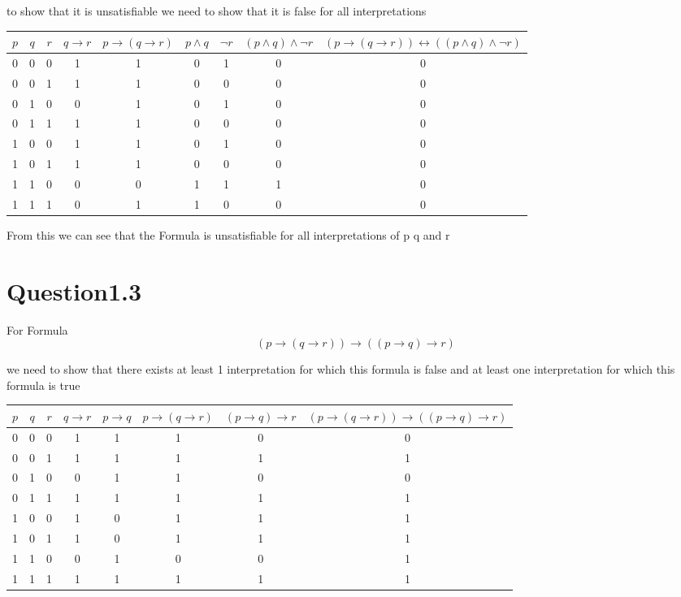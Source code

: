 \documentclass[10pt,a4paper]{article}
\begin{document}
to show that it is unsatisfiable we need to show that it is false for all interpretations

\begin{tabular}{|c|c|c|c|c|c|c|c|c|}
\hline
$p$ & $q$ & $r$ & $q \rightarrow r$ & $p \rightarrow ( q \rightarrow r )$ & $p \wedge q$ & $\neg r$ & $( p \wedge q) \wedge \neg r $ & $(p \rightarrow ( q \rightarrow r )) \leftrightarrow (( p \wedge q) \wedge \neg r) $\\
\hline
 0 & 0 & 0 & 1 & 1 & 0 & 1 & 0 & 0\\
 0 & 0 & 1 & 1 & 1 & 0 & 0 & 0 & 0\\
 0 & 1 & 0 & 0 & 1 & 0 & 1 & 0 & 0\\
 0 & 1 & 1 & 1 & 1 & 0 & 0 & 0 & 0\\
 1 & 0 & 0 & 1 & 1 & 0 & 1 & 0 & 0\\
 1 & 0 & 1 & 1 & 1 & 0 & 0 & 0 & 0\\
 1 & 1 & 0 & 0 & 0 & 1 & 1 & 1 & 0\\
 1 & 1 & 1 & 0 & 1 & 1 & 0 & 0 & 0\\
\hline
\end{tabular}

From this we can see that the Formula is unsatisfiable for all interpretations of p q and r

\section{Question1.3}

For Formula
\begin{equation}
(p \rightarrow (q \rightarrow r)) \rightarrow ((p \rightarrow q)  \rightarrow r)
\end{equation}

we need to show that there exists at least 1 interpretation for which this formula is false
and at least one interpretation for which this formula is true

\begin{tabular}{|c|c|c|c|c|c|c|c|}
\hline
$p$ & $q$ & $r$ & $q \rightarrow r$ & $p \rightarrow q$ & $p \rightarrow (q \rightarrow r)$ &$ (p \rightarrow q)  \rightarrow r$ & $(p \rightarrow (q \rightarrow r)) \rightarrow ((p \rightarrow q)  \rightarrow r)$ \\ 
\hline
 0 & 0 & 0 & 1 & 1 & 1 & 0 & 0\\
 0 & 0 & 1 & 1 & 1 & 1 & 1 & 1\\
 0 & 1 & 0 & 0 & 1 & 1 & 0 & 0\\
 0 & 1 & 1 & 1 & 1 & 1 & 1 & 1\\
 1 & 0 & 0 & 1 & 0 & 1 & 1 & 1\\
 1 & 0 & 1 & 1 & 0 & 1 & 1 & 1\\
 1 & 1 & 0 & 0 & 1 & 0 & 0 & 1\\
 1 & 1 & 1 & 1 & 1 & 1 & 1 & 1\\
\hline
\end{tabular}
\end{document}
